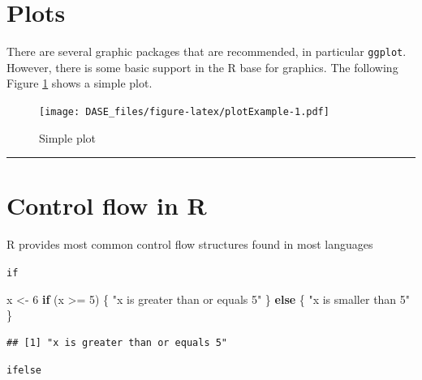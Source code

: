 \documentclass[
]{book}
\newenvironment{Shaded}{\begin{snugshade}}{\end{snugshade}}
\newcommand{\ControlFlowTok}[1]{\textcolor[rgb]{0.13,0.29,0.53}{\textbf{#1}}}
\newcommand{\DecValTok}[1]{\textcolor[rgb]{0.00,0.00,0.81}{#1}}
\newcommand{\FunctionTok}[1]{\textcolor[rgb]{0.00,0.00,0.00}{#1}}
\newcommand{\NormalTok}[1]{#1}
\newcommand{\OtherTok}[1]{\textcolor[rgb]{0.56,0.35,0.01}{#1}}
\newcommand{\SpecialCharTok}[1]{\textcolor[rgb]{0.00,0.00,0.00}{#1}}
\newcommand{\StringTok}[1]{\textcolor[rgb]{0.31,0.60,0.02}{#1}}
\begin{document}
\hypertarget{plots}{%
\section{Plots}\label{plots}}

There are several graphic packages that are recommended, in particular \texttt{ggplot}. However, there is some basic support in the R base for graphics. The following Figure \ref{fig:plotExample} shows a simple plot.

\begin{Shaded}
\end{Shaded}

\begin{figure}
\centering
\texttt{[image: DASE\_files/figure-latex/plotExample-1.pdf]}
\caption{\label{fig:plotExample}Simple plot}
\end{figure}

\begin{center}\rule{0.5\linewidth}{0.5pt}\end{center}

\hypertarget{control-flow-in-r}{%
\section{Control flow in R}\label{control-flow-in-r}}

R provides most common control flow structures found in most languages

\texttt{if}

\begin{Shaded}
\begin{Highlighting}[]
\NormalTok{x }\OtherTok{\textless{}{-}} \DecValTok{6}
\ControlFlowTok{if}\NormalTok{ (x }\SpecialCharTok{\textgreater{}=} \DecValTok{5}\NormalTok{) \{}
    \StringTok{"x is greater than or equals 5"}
\NormalTok{\} }\ControlFlowTok{else}\NormalTok{ \{}
    \StringTok{"x is smaller than 5"}
\NormalTok{\}}
\end{Highlighting}
\end{Shaded}

\begin{verbatim}
## [1] "x is greater than or equals 5"
\end{verbatim}

\texttt{ifelse}
\end{document}
